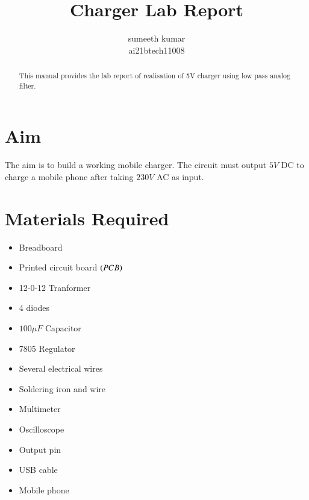 \documentclass[journal,12pt,twocolumn]{IEEEtran}
\begin{document}
\makeatletter
{}
\makeatother
\let\StandardTheFigure\thefigure
\renewcommand{\thefigure}{\theproblem}
\def\putbox#1#2#3{\makebox[0in][l]{\makebox[#1][l]{}\raisebox{\baselineskip}[0in][0in]{\raisebox{#2}[0in][0in]{#3}}}}
     \def\rightbox#1{\makebox[0in][r]{#1}}
     \def\centbox#1{\makebox[0in]{#1}}
     \def\topbox#1{\raisebox{-\baselineskip}[0in][0in]{#1}}
     \def\midbox#1{\raisebox{-0.5\baselineskip}[0in][0in]{#1}}
\vspace{3cm}
\title{ 
Charger Lab Report
}
\author{ sumeeth kumar \\ai21btech11008 %
}
\maketitle
\tableofcontents
\renewcommand{\thefigure}{\theenumi}
\renewcommand{\thetable}{\theenumi}
\bigskip
\begin{abstract}
This manual provides the lab report of realisation of 5V charger using low pass analog filter. 
\end{abstract}
\section{Aim}
	The aim is to build a working mobile charger. The circuit must output $5V$ DC to charge a mobile phone after taking $230V$ AC as input.
	
	\section{Materials Required}
	\begin{itemize}
	\item Breadboard
	\item Printed circuit board $\left(PCB\right)$
	\item 12-0-12 Tranformer
	\item 4 diodes
	\item $100 \mu F$ Capacitor
	\item 7805 Regulator
	\item Several electrical wires
	\item Soldering iron and wire
	\item Multimeter
	\item Oscilloscope
	\item Output pin
	\item USB cable
	\item Mobile phone
	\end{itemize}
\end{document}
